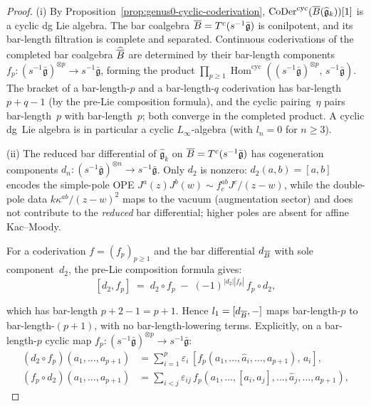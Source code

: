 \begin{proof}
(i)\enspace
By Proposition~\ref{prop:genus0-cyclic-coderivation},
$\operatorname{CoDer}^{\mathrm{cyc}}(\overline{B}(\widehat{\mathfrak{g}}_k))[1]$
is a cyclic dg Lie algebra.
The bar coalgebra $\overline{B} = T^c(s^{-1}\bar{\mathfrak{g}})$ is
conilpotent, and its bar-length filtration is complete and separated.
Continuous coderivations of the completed bar coalgebra
$\widehat{\overline{B}}$ are determined by their bar-length components
$f_p\colon (s^{-1}\bar{\mathfrak{g}})^{\otimes p}
\to s^{-1}\bar{\mathfrak{g}}$, forming the product
$\prod_{p \geq 1}
\operatorname{Hom}^{\mathrm{cyc}}
((s^{-1}\bar{\mathfrak{g}})^{\otimes p},\,
s^{-1}\bar{\mathfrak{g}})$.
The bracket of a bar-length-$p$ and a bar-length-$q$ coderivation
has bar-length $p + q - 1$ (by the pre-Lie composition formula),
and the cyclic pairing~$\eta$ pairs bar-length~$p$ with
bar-length~$p$; both converge in the completed product.
A cyclic dg~Lie algebra is in particular a cyclic
$L_\infty$-algebra (with $l_n = 0$ for $n \geq 3$).

(ii)\enspace
The reduced bar differential of $\widehat{\mathfrak{g}}_k$ on
$\overline{B} = T^c(s^{-1}\bar{\mathfrak{g}})$ has cogeneration components
$d_n\colon (s^{-1}\bar{\mathfrak{g}})^{\otimes n}
\to s^{-1}\bar{\mathfrak{g}}$.
Only $d_2$ is nonzero: $d_2(a,b) = [a,b]$ encodes the simple-pole
OPE $J^a(z)J^b(w) \sim f^{ab}_c J^c/(z{-}w)$, while the double-pole
data $k\kappa^{ab}/(z{-}w)^2$ maps to the vacuum (augmentation
sector) and does not contribute to the \emph{reduced} bar
differential; higher poles are absent for affine Kac--Moody.

For a coderivation $f = (f_p)_{p \geq 1}$ and the bar differential
$d_{\overline{B}}$ with sole component~$d_2$, the pre-Lie composition
formula gives:
\[
[d_2, f_p]
\;=\; d_2 \circ f_p \;-\; (-1)^{|d_2||f_p|}\, f_p \circ d_2,
\]

which has bar-length $p + 2 - 1 = p + 1$.  Hence $l_1 = [d_{\overline{B}},-]$
maps bar-length-$p$ to bar-length-$(p{+}1)$, with no bar-length-lowering
terms.  Explicitly, on a bar-length-$p$ cyclic map
$f_p\colon (s^{-1}\bar{\mathfrak{g}})^{\otimes p}
\to s^{-1}\bar{\mathfrak{g}}$:
\begin{align*}
(d_2 \circ f_p)(a_1, \ldots, a_{p+1})
&= \sum_{i=1}^{p} \varepsilon_i\,
   [f_p(a_1, \ldots, \widehat{a}_i, \ldots, a_{p+1}),\, a_i], \\
(f_p \circ d_2)(a_1, \ldots, a_{p+1})
&= \sum_{i < j} \varepsilon_{ij}\,
   f_p(a_1, \ldots, [a_i, a_j], \ldots, \widehat{a}_j,
   \ldots, a_{p+1}),
\end{align*}


\end{proof}
